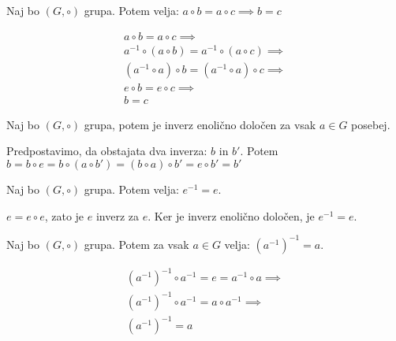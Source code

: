 \begin{trditev}
    Naj bo $(G, \circ)$ grupa.
    Potem velja: $a\circ b = a\circ c \implies b = c$
\end{trditev}
\begin{dokaz}
    \begin{align*}
        a\circ b = a\circ c \implies \\
        a^{-1} \circ (a \circ b) = a^{-1} \circ (a \circ c) \implies \\
        (a^{-1} \circ a) \circ b = (a^{-1} \circ a) \circ c \implies \\
        e \circ b = e \circ c \implies \\
        b = c
    \end{align*}
\end{dokaz}

\begin{trditev}
    Naj bo $(G, \circ)$ grupa, potem je inverz enolično določen za vsak $a \in G$ posebej.
\end{trditev}
\begin{dokaz}
    Predpostavimo, da obstajata dva inverza: $b$ in $b'$.
    Potem $b = b \circ e = b \circ (a \circ b') = (b \circ a) \circ b' = e \circ b' = b'$
\end{dokaz}

\begin{trditev}
    Naj bo $(G, \circ)$ grupa.
    Potem velja: $e^{-1} = e$.
\end{trditev}
\begin{dokaz}
    $e = e \circ e$, zato je $e$ inverz za $e$.
    Ker je inverz enolično določen, je $e^{-1} = e$.
\end{dokaz}

\begin{trditev}
    Naj bo $(G, \circ)$ grupa.
    Potem za vsak $a \in G$ velja: $(a^{-1})^{-1} = a$.
\end{trditev}
\begin{dokaz}
    \begin{align*}
        (a^{-1})^{-1} \circ a^{-1} = e = a^{-1} \circ a \implies \\
        (a^{-1})^{-1} \circ a^{-1} = a \circ a^{-1} \implies \\
        (a^{-1})^{-1} = a
    \end{align*}
\end{dokaz}